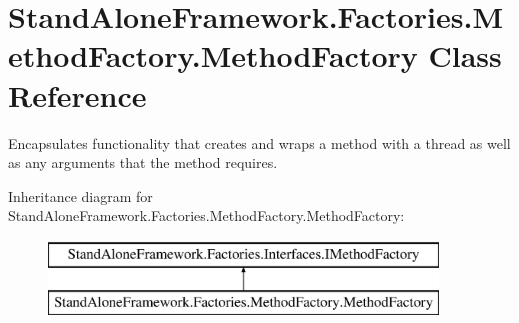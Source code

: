 \hypertarget{class_stand_alone_framework_1_1_factories_1_1_method_factory_1_1_method_factory}{\section{Stand\+Alone\+Framework.\+Factories.\+Method\+Factory.\+Method\+Factory Class Reference}
\label{class_stand_alone_framework_1_1_factories_1_1_method_factory_1_1_method_factory}
}


Encapsulates functionality that creates and wraps a method with a thread as well as any arguments that the method requires.  


Inheritance diagram for Stand\+Alone\+Framework.\+Factories.\+Method\+Factory.\+Method\+Factory\+:\begin{figure}[H]
\begin{center}
\leavevmode
\includegraphics[height=2.000000cm]{class_stand_alone_framework_1_1_factories_1_1_method_factory_1_1_method_factory}
\end{center}
\end{figure}
